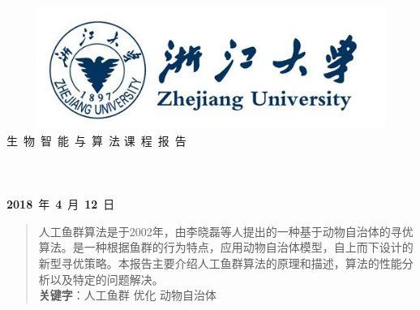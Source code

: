 \documentclass[UTF8]{ctexart}
\begin{document}
\begin{titlepage}
\centering
\vspace*{1.75cm}
\quad\includegraphics[width=15cm,height=4cm]{zju.png}\\
\vspace*{1cm}
{\fontsize{40pt}\baselineskip 生\ 物\ 智\ 能\ 与\ 算\ 法\vskip 0.5cm 课\ 程\ 报\ 告}
 \vskip 5cm
 \fontsize{19pt}\baselineskip
 \underline{}\\%
 \vskip 1.0cm
 \underline{}\\
 \vskip 1.0cm
 \underline{}\\
 \vskip 1.0cm
 \underline{}\\
 \vskip 1.2cm
 \LARGE \textbf{2018}~年~\textbf{4}~月~\textbf{12}~日		 
\end{titlepage}

 \begin{abstract}
 	\pagestyle{plain}
 	\thispagestyle{empty}
\par 人工鱼群算法是于2002年，由李晓磊等人提出的一种基于动物自治体的寻优算法。是一种根据鱼群的行为特点，应用动物自治体模型，自上而下设计的新型寻优策略。本报告主要介绍人工鱼群算法的原理和描述，算法的性能分析以及特定的问题解决。
\\[0.5cm]
\textbf{关键字}：\quad 人工鱼群 \quad 优化 \quad 动物自治体 
\newpage
\end{abstract}

\tableofcontents%
\end{document}
